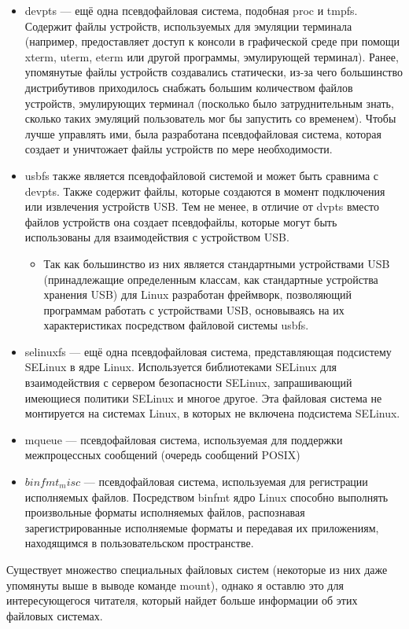 \documentclass[10pt]{book}
\begin{document}
\begin{itemize}
  \item devpts — ещё одна псевдофайловая система, подобная proc и tmpfs. Содержит файлы устройств, используемых для эмуляции терминала (например, предоставляет доступ к консоли в графической среде при помощи xterm, uterm, eterm или другой программы, эмулирующей терминал). Ранее, упомянутые файлы устройств создавались статически, из-за чего большинство дистрибутивов приходилось снабжать большим количеством файлов устройств, эмулирующих терминал (посколько было затруднительным знать, сколько таких эмуляций пользователь мог бы запустить со временем). Чтобы лучше управлять ими, была разработана псевдофайловая система, которая создает и уничтожает файлы устройств по мере необходимости.
  \item usbfs также является псевдофайловой системой и может быть сравнима с devpts. Также содержит файлы, которые создаются в момент подключения или извлечения устройств USB. Тем не менее, в отличие от dvpts вместо файлов устройств она создает псевдофайлы, которые могут быть использованы для взаимодействия с устройством USB.
  \begin{itemize}
    \item Так как большинство из них является стандартными устройствами USB (принадлежащие определенным классам, как стандартные устройства хранения USB) для Linux разработан фреймворк, позволяющий программам работать с устройствами USB, основываясь на их характеристиках посредством файловой системы usbfs.
  \end{itemize}
  \item selinuxfs — ещё одна псевдофайловая система, представляющая подсистему SELinux в ядре Linux. Используется библиотеками SELinux для взаимодействия с сервером безопасности SELinux, запрашивающий имеющиеся политики SELinux и многое другое. Эта файловая система не монтируется на системах Linux, в которых не включена подсистема SELinux.
  \item mqueue — псевдофайловая система, используемая для поддержки межпроцессных сообщений (очередь сообщений POSIX)
  \item $binfmt_misc$ — псевдофайловая система, используемая для регистрации исполняемых файлов. Посредством binfmt ядро Linux способно выполнять произвольные форматы исполняемых файлов, распознавая зарегистрированные исполняемые форматы и передавая их приложениям, находящимся в пользовательском пространстве. 
\end{itemize}

Существует множество специальных файловых систем (некоторые из них даже упомянуты выше в выводе команде mount), однако я оставлю это для интересующегося читателя, который найдет больше информации об этих файловых системах.
\end{document}
